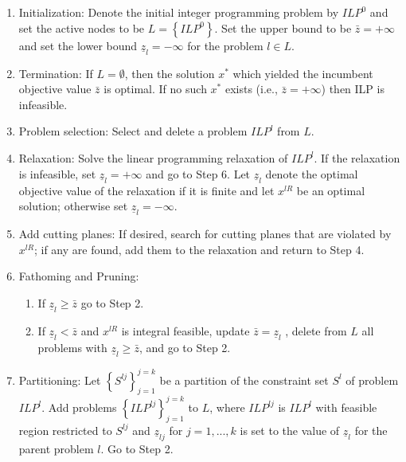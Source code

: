 \documentclass{SMBV12}
\begin{document}
\begin{enumerate}

\item Initialization: Denote the initial integer programming problem by $ILP^0$ and set the active nodes to be $L = \left\lbrace ILP^0 \right\rbrace $. Set the upper bound to be $\bar{z} = + \infty$ and set the lower bound $\underline{z}_l = - \infty$ for the problem $l \in L$.

\item Termination: If $L = \emptyset$, then the solution $x^*$ which yielded the incumbent objective value $\bar{z}$ is optimal. If no such $x^*$ exists (i.e., $\bar{z} = + \infty$) then ILP is infeasible.

\item Problem selection: Select and delete a problem $ILP^l$ from $L$.

\item Relaxation: Solve the linear programming relaxation of $ILP^l$. If the relaxation is infeasible, set $\underline{z}_l = + \infty$ and go to Step 6. Let $\underline{z}_l$ denote the optimal objective value of the relaxation if it is finite and let $x^{lR}$ be an optimal solution; otherwise set $\underline{z}_l = - \infty$.

\item Add cutting planes: If desired, search for cutting planes that are violated by $x^{lR}$; if any are found, add them to the relaxation and return to Step 4.

\item Fathoming and Pruning:

\begin{enumerate}
\item If $\underline{z}_l \geq \bar{z}$ go to Step 2.
\item If $\underline{z}_l < \bar{z}$ and $x^{lR}$ is integral feasible, update $\bar{z} = \underline{z}_l$ , delete from $L$ all problems with $\underline{z}_l \geq \bar{z}$, and go to Step 2.
\end{enumerate}

\item Partitioning: Let $\left\lbrace S^{lj} \right\rbrace _{j = 1} ^ {j = k}$ be a partition of the constraint set $S^l$ of problem $ILP^l$. Add problems $\left\lbrace ILP^{lj} \right\rbrace _{j = 1} ^ {j = k}$ to $L$, where $ILP^{lj}$ is $ILP^l$ with feasible region restricted to $S^{lj}$ and $\underline{z}_{lj}$ for $j = 1, ..., k$ is set to the value of $\underline{z}_l$ for the parent problem $l$. Go to Step 2.

\end{enumerate}
\end{document}
